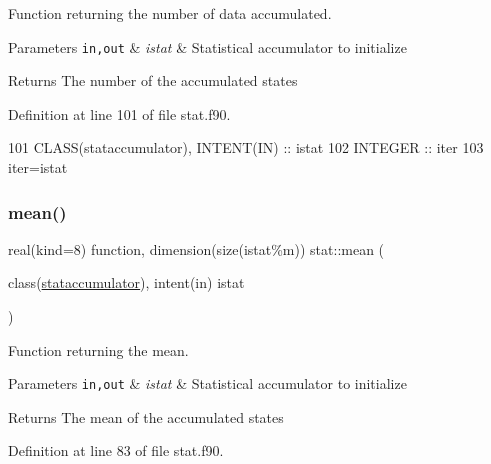 Function returning the number of data accumulated. 


\begin{DoxyParams}[1]{Parameters}
\mbox{\tt in,out}  & {\em istat} & Statistical accumulator to initialize \\
\hline
\end{DoxyParams}
\begin{DoxyReturn}{Returns}
The number of the accumulated states 
\end{DoxyReturn}


Definition at line 101 of file stat.\+f90.


\begin{DoxyCode}
101       \textcolor{keywordtype}{CLASS}(stataccumulator), \textcolor{keywordtype}{INTENT(IN)} :: istat
102       \textcolor{keywordtype}{INTEGER} :: iter
103       iter=istat%
\end{DoxyCode}
\mbox{\label{namespacestat_acb86e45d7c525e6e01b0e1b1c68ebe50}} 
\subsubsection{\texorpdfstring{mean()}{mean()}}
{\footnotesize\ttfamily real(kind=8) function, dimension(size(istat\%m)) stat\+::mean (\begin{DoxyParamCaption}\item[{class(\hyperlink{structstat_1_1stataccumulator}{stataccumulator}), intent(in)}]{istat }\end{DoxyParamCaption})\hspace{0.3cm}{\ttfamily [private]}}



Function returning the mean. 


\begin{DoxyParams}[1]{Parameters}
\mbox{\tt in,out}  & {\em istat} & Statistical accumulator to initialize \\
\hline
\end{DoxyParams}
\begin{DoxyReturn}{Returns}
The mean of the accumulated states 
\end{DoxyReturn}


Definition at line 83 of file stat.\+f90.


\mbox{\label{namespacestat_af4db26b95e6378e574313f3cd664c2f2}} 
